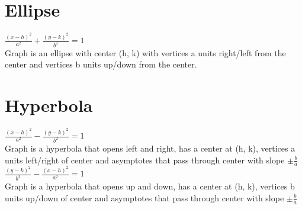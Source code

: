 \documentclass[10pt,onecolumn]{article}
\begin{document}
{\section{Ellipse}
\(\frac{(x - h)^2}{a^2} + \frac{(y - k)^2}{b^2} = 1\)  \\
Graph is an ellipse with center (h, k) with vertices a units right/left from the center and vertices b units up/down from the center.

\section{Hyperbola}
\(\frac{(x - h)^2}{a^2} - \frac{(y - k)^2}{b^2} = 1\)  \\
Graph is a hyperbola that opens left and right, has a center at (h, k), vertices a units left/right of center and asymptotes that pass through center with slope \(\pm \frac{b}{a}\) \\
\(\frac{(y - k)^2}{b^2} - \frac{(x - h)^2}{a^2} = 1\)  \\
Graph is a hyperbola that opens up and down, has a center at (h, k), vertices b units up/down of center and asymptotes that pass through center with slope \(\pm \frac{b}{a}\) \\


\pagebreak

}
\end{document}

